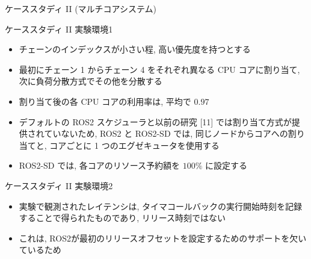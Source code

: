\begin{frame}{ケーススタディ II (マルチコアシステム)}
\end{frame}

\begin{frame}{ケーススタディ II 実験環境1}
    \begin{itemize}
        \item チェーンのインデックスが小さい程, 高い優先度を持つとする
        \item 最初にチェーン 1 からチェーン 4 をそれぞれ異なる CPU コアに割り当て, 次に負荷分散方式でその他を分散する
        \item 割り当て後の各 CPU コアの利用率は, 平均で $0.97$
        \item デフォルトの ROS2 スケジューラと以前の研究 [11] では割り当て方式が提供されていないため, ROS2 と ROS2-SD では, 同じノードからコアへの割り当てと, コアごとに 1 つのエグゼキュータを使用する
        \item ROS2-SD では, 各コアのリソース予約額を $100 \%$ に設定する
    \end{itemize}
\end{frame}

\begin{frame}[label=latency]{ケーススタディ II 実験環境2}
    \begin{itemize}
        \item 実験で観測されたレイテンシは, タイマコールバックの実行開始時刻を記録することで得られたものであり, リリース時刻ではない
        \item これは, ROS2が最初のリリースオフセットを設定するためのサポートを欠いているため
    \end{itemize}
\end{frame}


